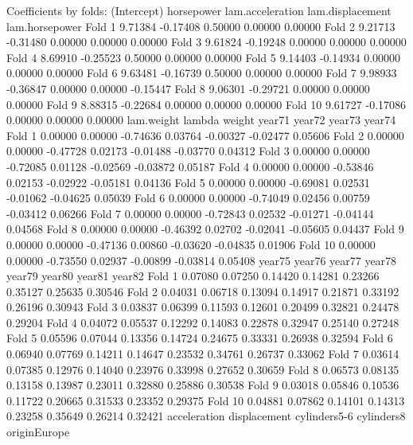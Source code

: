 \documentclass[
]{jss}
\begin{document}
\begin{CodeChunk}
\begin{CodeOutput}
Coefficients by folds:
        (Intercept) horsepower lam.acceleration lam.displacement lam.horsepower
Fold 1      9.71384   -0.17408          0.50000          0.00000        0.00000
Fold 2      9.21713   -0.31480          0.00000          0.00000        0.00000
Fold 3      9.61824   -0.19248          0.00000          0.00000        0.00000
Fold 4      8.69910   -0.25523          0.50000          0.00000        0.00000
Fold 5      9.14403   -0.14934          0.00000          0.00000        0.00000
Fold 6      9.63481   -0.16739          0.50000          0.00000        0.00000
Fold 7      9.98933   -0.36847          0.00000          0.00000       -0.15447
Fold 8      9.06301   -0.29721          0.00000          0.00000        0.00000
Fold 9      8.88315   -0.22684          0.00000          0.00000        0.00000
Fold 10     9.61727   -0.17086          0.00000          0.00000        0.00000
        lam.weight   lambda   weight   year71   year72   year73   year74
Fold 1     0.00000  0.00000 -0.74636  0.03764 -0.00327 -0.02477  0.05606
Fold 2     0.00000  0.00000 -0.47728  0.02173 -0.01488 -0.03770  0.04312
Fold 3     0.00000  0.00000 -0.72085  0.01128 -0.02569 -0.03872  0.05187
Fold 4     0.00000  0.00000 -0.53846  0.02153 -0.02922 -0.05181  0.04136
Fold 5     0.00000  0.00000 -0.69081  0.02531 -0.01062 -0.04625  0.05039
Fold 6     0.00000  0.00000 -0.74049  0.02456  0.00759 -0.03412  0.06266
Fold 7     0.00000  0.00000 -0.72843  0.02532 -0.01271 -0.04144  0.04568
Fold 8     0.00000  0.00000 -0.46392  0.02702 -0.02041 -0.05605  0.04437
Fold 9     0.00000  0.00000 -0.47136  0.00860 -0.03620 -0.04835  0.01906
Fold 10    0.00000  0.00000 -0.73550  0.02937 -0.00899 -0.03814  0.05408
          year75   year76   year77   year78   year79   year80   year81   year82
Fold 1   0.07080  0.07250  0.14420  0.14281  0.23266  0.35127  0.25635  0.30546
Fold 2   0.04031  0.06718  0.13094  0.14917  0.21871  0.33192  0.26196  0.30943
Fold 3   0.03837  0.06399  0.11593  0.12601  0.20499  0.32821  0.24478  0.29204
Fold 4   0.04072  0.05537  0.12292  0.14083  0.22878  0.32947  0.25140  0.27248
Fold 5   0.05596  0.07044  0.13356  0.14724  0.24675  0.33331  0.26938  0.32594
Fold 6   0.06940  0.07769  0.14211  0.14647  0.23532  0.34761  0.26737  0.33062
Fold 7   0.03614  0.07385  0.12976  0.14040  0.23976  0.33998  0.27652  0.30659
Fold 8   0.06573  0.08135  0.13158  0.13987  0.23011  0.32880  0.25886  0.30538
Fold 9   0.03018  0.05846  0.10536  0.11722  0.20665  0.31533  0.23352  0.29375
Fold 10  0.04881  0.07862  0.14101  0.14313  0.23258  0.35649  0.26214  0.32421
        acceleration displacement cylinders5-6 cylinders8 originEurope

\end{CodeOutput}
\end{CodeChunk}
\end{document}
